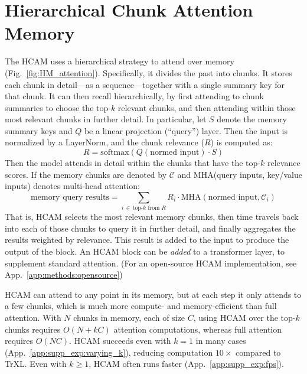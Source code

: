 \documentclass{article}
\begin{document}
\section{Hierarchical Chunk Attention Memory}


The HCAM uses a hierarchical strategy to attend over memory (Fig.\ \ref{fig:HM_attention}). Specifically, it divides the past into chunks. It stores each chunk in detail---as a sequence---together with a single summary key for that chunk. It can then recall hierarchically, by first attending to chunk summaries to choose the top-\(k\) relevant chunks, and then attending within those most relevant chunks in further detail.
%
In particular, let \(S\) denote the memory summary keys and \(Q\) be a linear projection (``query'') layer. Then the input is normalized by a LayerNorm, and the chunk relevance (\(R\)) is computed as:
\[
R = \text{softmax}(Q(\text{normed input}) \cdot S)
\]
Then the model attends in detail within the chunks that have the top-\(k\) relevance scores. If the memory chunks are denoted by \(\mathcal{C}\) and MHA(query inputs, key/value inputs) denotes multi-head attention:
\[
\text{memory query results} = \sum_{i\, \in \, \text{top-}k \text{ from } R} R_i \cdot \text{MHA}(\text{normed input}, \mathcal{C}_i)
\]
That is, HCAM selects the most relevant memory chunks, then time travels back into each of those chunks to query it in further detail, and finally aggregates the results weighted by relevance. %
This result is added to the input to produce the output of the block. An HCAM block can be \emph{added} to a transformer layer, to supplement standard attention. (For an open-source HCAM implementation, see App.\ \ref{app:methods:opensource})

HCAM can attend to any point in its memory, but at each step it only attends to a few chunks, which is much more compute- and memory-efficient than full attention. With \(N\) chunks in memory, each of size \(C\), using HCAM over the top-\(k\) chunks requires \(O(N + kC)\) attention computations, whereas full attention requires \(O(NC)\). HCAM succeeds even with \(k=1\) in many cases (App.\ \ref{app:supp_exp:varying_k}), reducing computation \(10\times\) compared to TrXL. Even with \(k \geq 1\), HCAM often runs faster (App.\ \ref{app:supp_exp:fps}).
\end{document}
